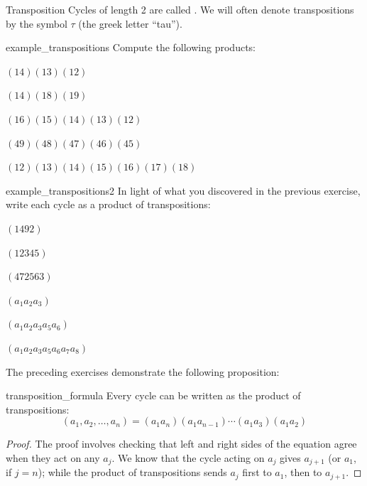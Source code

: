 \begin{defn}{Transposition}
Cycles of length 2 are called  .   We will often denote transpositions by the symbol $\tau$ (the greek letter ``tau'').
\end{defn}

\begin{exercise}{example_transpositions}
Compute the following products:
\begin{enumerate}[(a)]
\begin{multicols}{2}
\item
$(1 4)(1 3) (1 2)$
\item
$(1 4)(1 8) (1 9)$
\item
$(1 6)(1 5) (1 4)(1 3)(1 2)$
\item
$(4 9)(4 8) (4 7)(4 6)(4 5)$
\item
$(1 2)(1 3)(1 4)(1 5) (1 6)(1 7)(1 8)$

\end{multicols}
\end{enumerate}
\end{exercise}

\begin{exercise}{example_transpositions2}
In light of what you discovered in the previous exercise, write each cycle as a product of transpositions:
\begin{enumerate}[(a)]
\begin{multicols}{3}
\item
$(1 4 9 2)$
\item
$(1 2 3 4 5)$
\item
$(4 7 2 5 6 3)$
\item
$(a_1 a_2 a_3)$
\item
$(a_1 a_2 a_3 a_5 a_6)$
\item
$(a_1 a_2 a_3 a_5 a_6 a_7 a_8)$

\end{multicols}
\end{enumerate}
\end{exercise}

\noindent
The preceding exercises demonstrate the following proposition:

\begin{prop}{transposition_formula}
Every cycle can be written as the product of transpositions:
\[ (a_1, a_2, \ldots, a_n ) = (a_1 a_n ) (a_1 a_{n-1} ) \cdots ( a_1 a_3 ) (a_1 a_2 ) \]
\end{prop}
\begin{proof}
The proof involves checking that left and right sides of the equation agree when they act on any $a_j$. We know that the cycle acting on $a_j$ gives $a_{j+1}$ (or $a_1$, if $j = n$); while the product of transpositions sends $a_j$ first to $a_1$, then to $a_{j+1}$.
\end{proof}


